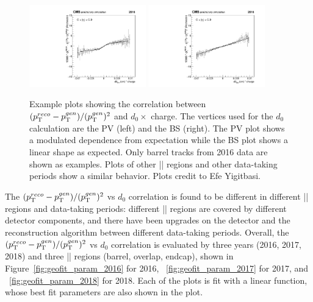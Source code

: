 \begin{figure}[!htb]
      \centering
      \captionsetup{justification=justified}
      \includegraphics[width=0.45\textwidth]{pics/muon_corr/GeoFit/fit_results/d0_pt_PV_eg.pdf}
      \includegraphics[width=0.45\textwidth]{pics/muon_corr/GeoFit/fit_results/d0_pt_BS_eg.pdf}
      \caption{Example plots showing the correlation between $(p_{\mathrm{T}}^{reco}-p_{\mathrm{T}}^{gen})/ (p_{\mathrm{T}}^{gen})^{2}$ and $d_0 \times$ charge.
               The vertices used for the $d_0$ calculation are the PV (left) and the BS (right). 
               The PV plot shows a modulated dependence from expectation while the BS plot shows a linear shape as expected.
               Only barrel tracks from 2016 data are shown as examples. 
               Plots of other |\eta| regions and other data-taking periods show a similar behavior.
               Plots credit to Efe Yigitbasi.}
      \label{fig:pv_vs_bs_fits}
\end{figure}

The $(p_{\mathrm{T}}^{reco}-p_{\mathrm{T}}^{gen})/ (p_{\mathrm{T}}^{gen})^{2}$ vs $d_0$ correlation is found to be different in different |\eta| regions and data-taking periods: 
different |\eta| regions are covered by different detector components, and there have been upgrades on the detector and the reconstruction algorithm between different data-taking periods.
Overall, the $(p_{\mathrm{T}}^{reco}-p_{\mathrm{T}}^{gen})/ (p_{\mathrm{T}}^{gen})^{2}$ vs $d_0$ correlation is evaluated by three years (2016, 2017, 2018) and 
three |\eta| regions (barrel, overlap, endcap), shown in Figure~\ref{fig:geofit_param_2016} for 2016, ~\ref{fig:geofit_param_2017} for 2017, and ~\ref{fig:geofit_param_2018} for 2018.
Each of the plots is fit with a linear function, whose best fit parameters are also shown in the plot.

